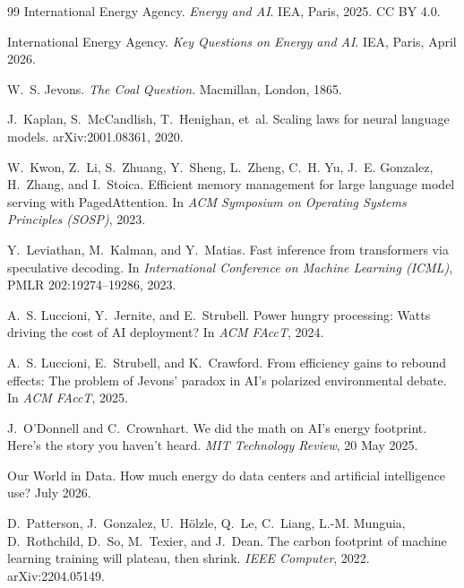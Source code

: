 \documentclass[11pt]{article}
\theoremstyle{definition}
\theoremstyle{remark}
\begin{document}
\begin{thebibliography}{99}
International Energy Agency.
\newblock \emph{Energy and AI}.
\newblock IEA, Paris, 2025. CC BY 4.0.

International Energy Agency.
\newblock \emph{Key Questions on Energy and AI}.
\newblock IEA, Paris, April 2026.

W.~S. Jevons.
\newblock \emph{The Coal Question}.
\newblock Macmillan, London, 1865.

J.~Kaplan, S.~McCandlish, T.~Henighan, et~al.
\newblock Scaling laws for neural language models.
\newblock arXiv:2001.08361, 2020.

W.~Kwon, Z.~Li, S.~Zhuang, Y.~Sheng, L.~Zheng, C.~H. Yu, J.~E. Gonzalez, H.~Zhang, and I.~Stoica.
\newblock Efficient memory management for large language model serving with PagedAttention.
\newblock In \emph{ACM Symposium on Operating Systems Principles (SOSP)}, 2023.

Y.~Leviathan, M.~Kalman, and Y.~Matias.
\newblock Fast inference from transformers via speculative decoding.
\newblock In \emph{International Conference on Machine Learning (ICML)}, PMLR 202:19274--19286, 2023.

A.~S. Luccioni, Y.~Jernite, and E.~Strubell.
\newblock Power hungry processing: Watts driving the cost of AI deployment?
\newblock In \emph{ACM FAccT}, 2024.

A.~S. Luccioni, E.~Strubell, and K.~Crawford.
\newblock From efficiency gains to rebound effects: The problem of Jevons' paradox in AI's polarized environmental debate.
\newblock In \emph{ACM FAccT}, 2025.

J.~O'Donnell and C.~Crownhart.
\newblock We did the math on AI's energy footprint. Here's the story you haven't heard.
\newblock \emph{MIT Technology Review}, 20 May 2025.

Our World in Data.
\newblock How much energy do data centers and artificial intelligence use?
\newblock July 2026.

D.~Patterson, J.~Gonzalez, U.~H\"olzle, Q.~Le, C.~Liang, L.-M. Munguia, D.~Rothchild, D.~So, M.~Texier, and J.~Dean.
\newblock The carbon footprint of machine learning training will plateau, then shrink.
\newblock \emph{IEEE Computer}, 2022. arXiv:2204.05149.


\end{thebibliography}
\end{document}

